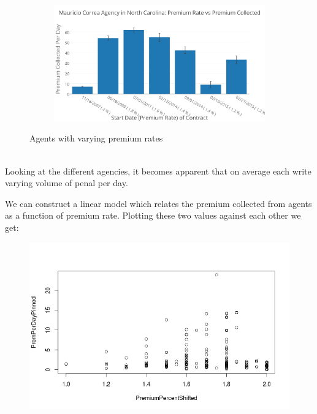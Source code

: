 \documentclass{article}
\begin{document}
\begin{center}
\begin{figure}[H]
\begin{subfigure}[b]{0.5\textwidth}
\end{subfigure}
\begin{subfigure}[b]{0.5\textwidth}
\includegraphics[width=\textwidth]{Mauricio_Correa_Agency_in_North_Carolina-_Premium_Rate_vs_Premium_Collected.png}
\end{subfigure}
\caption{Agents with varying premium rates}
\end{figure}
\end{center}
~\\

Looking at the different agencies, it becomes apparent that on average each write varying volume of penal per day.  

We can construct a linear model which relates the premium collected from agents as a function of premium rate.
Plotting these two values against each other we get: 

\begin{figure}[H]
\centering
\includegraphics[width=0.45\paperwidth]{premPinnedNoLine.png}
\end{figure}
\end{document}
